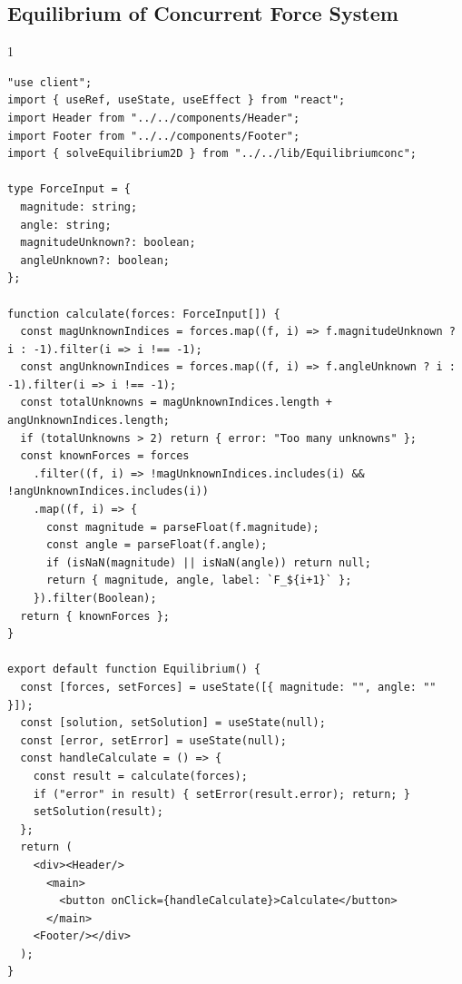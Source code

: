 \subsection*{Equilibrium of Concurrent Force System}
\begin{spacing}{1}
\begin{Verbatim}[breaklines=true, breaksymbolleft={}, breaksymbolright={}]
"use client";
import { useRef, useState, useEffect } from "react";
import Header from "../../components/Header";
import Footer from "../../components/Footer";
import { solveEquilibrium2D } from "../../lib/Equilibriumconc";

type ForceInput = {
  magnitude: string;
  angle: string;
  magnitudeUnknown?: boolean;
  angleUnknown?: boolean;
};

function calculate(forces: ForceInput[]) {
  const magUnknownIndices = forces.map((f, i) => f.magnitudeUnknown ? i : -1).filter(i => i !== -1);
  const angUnknownIndices = forces.map((f, i) => f.angleUnknown ? i : -1).filter(i => i !== -1);
  const totalUnknowns = magUnknownIndices.length + angUnknownIndices.length;
  if (totalUnknowns > 2) return { error: "Too many unknowns" };
  const knownForces = forces
    .filter((f, i) => !magUnknownIndices.includes(i) && !angUnknownIndices.includes(i))
    .map((f, i) => {
      const magnitude = parseFloat(f.magnitude);
      const angle = parseFloat(f.angle);
      if (isNaN(magnitude) || isNaN(angle)) return null;
      return { magnitude, angle, label: `F_${i+1}` };
    }).filter(Boolean);
  return { knownForces };
}

export default function Equilibrium() {
  const [forces, setForces] = useState([{ magnitude: "", angle: "" }]);
  const [solution, setSolution] = useState(null);
  const [error, setError] = useState(null);
  const handleCalculate = () => {
    const result = calculate(forces);
    if ("error" in result) { setError(result.error); return; }
    setSolution(result);
  };
  return (
    <div><Header/>
      <main>
        <button onClick={handleCalculate}>Calculate</button>
      </main>
    <Footer/></div>
  );
}
\end{Verbatim}
\end{spacing}

